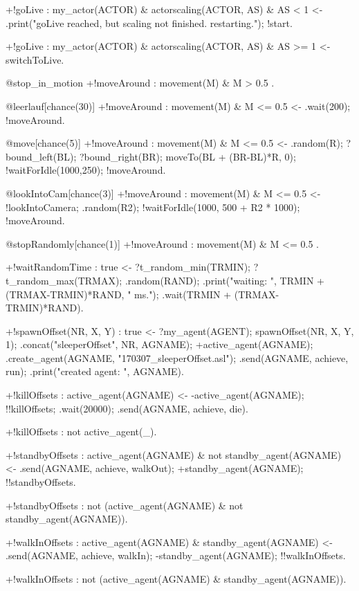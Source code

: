 \documentclass[draft,final]{vutinfth} %
\begin{document}
{+!goLive : my\_actor(ACTOR) \& actorscaling(ACTOR, AS) \& AS < 1
   <-  .print("goLive reached, but scaling not finished. restarting.");
       !start.

+!goLive : my\_actor(ACTOR) \& actorscaling(ACTOR, AS) \& AS >= 1
    <-  switchToLive.

@stop\_in\_motion
+!moveAround : movement(M) \& M > 0.5 .

@leerlauf[chance(30)]
+!moveAround : movement(M) \& M <= 0.5
    <-  .wait(200);
        !moveAround.

@move[chance(5)]
+!moveAround : movement(M) \& M <= 0.5
    <-  .random(R);
        ?bound\_left(BL);
        ?bound\_right(BR);
        moveTo(BL + (BR-BL)*R, 0);
        !waitForIdle(1000,250);
        !moveAround.

@lookIntoCam[chance(3)]
+!moveAround : movement(M) \& M <= 0.5
    <-  !lookIntoCamera;
        .random(R2);
        !waitForIdle(1000, 500 + R2 * 1000);
        !moveAround.

@stopRandomly[chance(1)]
+!moveAround : movement(M) \& M <= 0.5 .

+!waitRandomTime : true
    <-  ?t\_random\_min(TRMIN);
        ?t\_random\_max(TRMAX);
        .random(RAND);
        .print("waiting: ", TRMIN + (TRMAX-TRMIN)*RAND, " ms.");
        .wait(TRMIN + (TRMAX-TRMIN)*RAND).

+!spawnOffset(NR, X, Y) : true
        <-  ?my\_agent(AGENT);
            spawnOffset(NR, X, Y, 1);
            .concat("sleeperOffset", NR, AGNAME);
            +active\_agent(AGNAME);
            .create\_agent(AGNAME, "170307\_sleeperOffset.asl");
            .send(AGNAME, achieve, run);
            .print("created agent: ", AGNAME).

+!killOffsets : active\_agent(AGNAME)
    <-  -active\_agent(AGNAME);
        !!killOffsets;
        .wait(20000);
        .send(AGNAME, achieve, die).

+!killOffsets : not active\_agent(\_).

+!standbyOffsets : active\_agent(AGNAME) \& not standby\_agent(AGNAME)
    <-  .send(AGNAME, achieve, walkOut);
        +standby\_agent(AGNAME);
        !!standbyOffsets.

+!standbyOffsets : not (active\_agent(AGNAME) \& not standby\_agent(AGNAME)).

+!walkInOffsets : active\_agent(AGNAME) \& standby\_agent(AGNAME)
    <-  .send(AGNAME, achieve, walkIn);
        -standby\_agent(AGNAME);
        !!walkInOffsets.

+!walkInOffsets : not (active\_agent(AGNAME) \& standby\_agent(AGNAME)).

}
\end{document}
